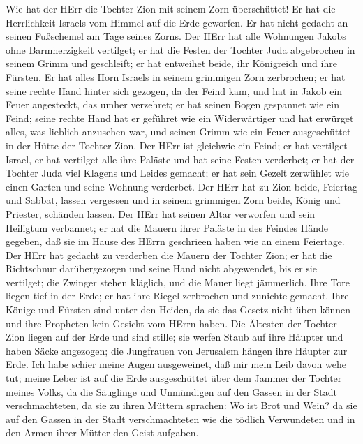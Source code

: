  Wie hat der HErr die Tochter Zion mit seinem Zorn
überschüttet! Er hat die Herrlichkeit Israels vom Himmel auf die Erde
geworfen. Er hat nicht gedacht an seinen Fußschemel am Tage seines
Zorns.  Der HErr hat alle Wohnungen Jakobs ohne
Barmherzigkeit vertilget; er hat die Festen der Tochter Juda abgebrochen
in seinem Grimm und geschleift; er hat entweihet beide, ihr Königreich
und ihre Fürsten.  Er hat alles Horn Israels in seinem
grimmigen Zorn zerbrochen; er hat seine rechte Hand hinter sich gezogen,
da der Feind kam, und hat in Jakob ein Feuer angesteckt, das umher
verzehret;  er hat seinen Bogen gespannet wie ein Feind;
seine rechte Hand hat er geführet wie ein Widerwärtiger und hat erwürget
alles, was lieblich anzusehen war, und seinen Grimm wie ein Feuer
ausgeschüttet in der Hütte der Tochter Zion.  Der HErr ist
gleichwie ein Feind; er hat vertilget Israel, er hat vertilget alle ihre
Paläste und hat seine Festen verderbet; er hat der Tochter Juda viel
Klagens und Leides gemacht;  er hat sein Gezelt zerwühlet
wie einen Garten und seine Wohnung verderbet. Der HErr hat zu Zion
beide, Feiertag und Sabbat, lassen vergessen und in seinem grimmigen
Zorn beide, König und Priester, schänden lassen.  Der HErr
hat seinen Altar verworfen und sein Heiligtum verbannet; er hat die
Mauern ihrer Paläste in des Feindes Hände gegeben, daß sie im Hause des
HErrn geschrieen haben wie an einem Feiertage.  Der HErr hat
gedacht zu verderben die Mauern der Tochter Zion; er hat die Richtschnur
darübergezogen und seine Hand nicht abgewendet, bis er sie vertilget;
die Zwinger stehen kläglich, und die Mauer liegt jämmerlich.
 Ihre Tore liegen tief in der Erde; er hat ihre Riegel
zerbrochen und zunichte gemacht. Ihre Könige und Fürsten sind unter den
Heiden, da sie das Gesetz nicht üben können und ihre Propheten kein
Gesicht vom HErrn haben.  Die Ältesten der Tochter Zion
liegen auf der Erde und sind stille; sie werfen Staub auf ihre Häupter
und haben Säcke angezogen; die Jungfrauen von Jerusalem hängen ihre
Häupter zur Erde.  Ich habe schier meine Augen ausgeweinet,
daß mir mein Leib davon wehe tut; meine Leber ist auf die Erde
ausgeschüttet über dem Jammer der Tochter meines Volks, da die Säuglinge
und Unmündigen auf den Gassen in der Stadt verschmachteten,
 da sie zu ihren Müttern sprachen: Wo ist Brot und Wein? da
sie auf den Gassen in der Stadt verschmachteten wie die tödlich
Verwundeten und in den Armen ihrer Mütter den Geist aufgaben.
